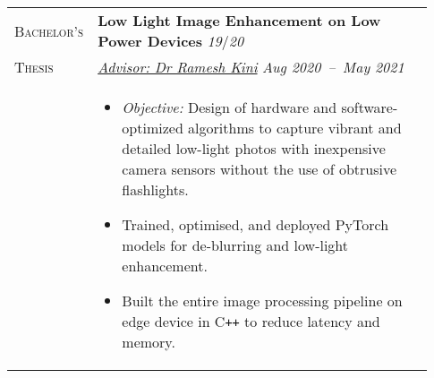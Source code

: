 \documentclass[letterpaper, 10pt, oneside]{article}
\newcommand{\stitle}[1]{\normalsize{\textsc{#1}}}
\newcommand{\bdit}[1]{{\textbf{#1}}}
\begin{document}
\begin{longtable}{@{} p{0.13\linewidth} p{0.8\linewidth}}
    \stitle{Bachelor's}  & \bdit{Low Light Image Enhancement on Low Power Devices} \hfill \textsl{19}/\textsl{20}                                                                                                               \\
    \stitle{Thesis}      & \textsl{\href{https://ece.nitk.ac.in/faculty/ramesh-kini-m}{Advisor: Dr Ramesh Kini}} \hfill \textsl{Aug 2020\ --\ May 2021}                                                                         \\
                         & \parbox{0.8\textwidth}{                                                                                                                                                                              %
        \begin{itemize}[leftmargin=*, itemsep=-0.70ex, topsep=-0.88ex]
            \item \textsl{Objective:} Design of hardware and software-optimized algorithms to capture vibrant and detailed low-light photos with inexpensive camera sensors without the use of obtrusive flashlights.
            \item Trained, optimised, and deployed PyTorch models for de-blurring and low-light enhancement.
            \item Built the entire image processing pipeline on edge device in C\texttt{++} to reduce latency and memory.
        \end{itemize}
    }
    \\
    \\





\end{longtable}
\end{document}
